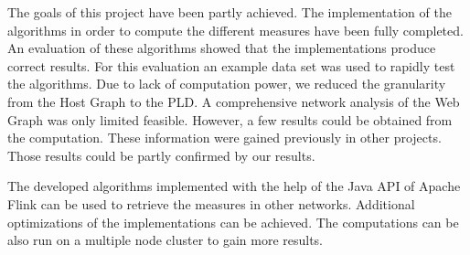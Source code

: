 The goals of this project have been partly achieved. The implementation of the algorithms in order to compute the different measures have been fully completed. An evaluation of these algorithms showed that the implementations produce correct results. For this evaluation an example data set was used to rapidly test the algorithms. Due to lack of computation power, we reduced the granularity from the Host Graph to the PLD. A comprehensive network analysis of the Web Graph was only limited feasible. However, a few results could be obtained from the computation. These information were gained previously in other projects. Those results could be partly confirmed by our results.

The developed algorithms implemented with the help of the Java API of Apache Flink can be used to retrieve the measures in other networks. Additional optimizations of the implementations can be achieved. The computations can be also run on a multiple node cluster to gain more results. 